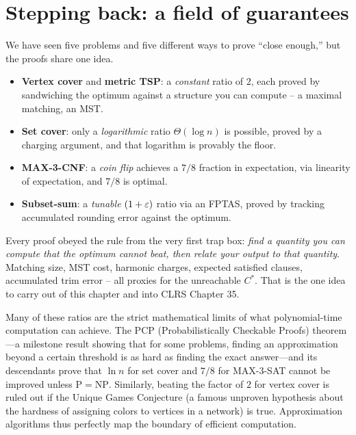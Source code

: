 \section{Stepping back: a field of guarantees}

We have seen five problems and five different ways to prove ``close
enough,'' but the proofs share one idea.

\begin{itemize}
\item \textbf{Vertex cover} and \textbf{metric TSP}: a \emph{constant} ratio
of $2$, each proved by sandwiching the optimum against a structure you can
compute -- a maximal matching, an MST.
\item \textbf{Set cover}: only a \emph{logarithmic} ratio $\Theta(\log n)$ is
possible, proved by a charging argument, and that logarithm is provably the
floor.
\item \textbf{MAX-3-CNF}: a \emph{coin flip} achieves a $7/8$ fraction in
expectation, via linearity of expectation, and $7/8$ is optimal.
\item \textbf{Subset-sum}: a \emph{tunable} $(1+\varepsilon)$ ratio via an FPTAS,
proved by tracking accumulated rounding error against the optimum.
\end{itemize}

Every proof obeyed the rule from the very first trap box: \emph{find a
quantity you can compute that the optimum cannot beat, then relate your output
to that quantity}. Matching size, MST cost, harmonic charges, expected
satisfied clauses, accumulated trim error -- all proxies for the unreachable
$C^{*}$. That is the one idea to carry out of this chapter and into CLRS
Chapter 35.

\begin{aestheticbox}
Many of these ratios are the strict mathematical limits of what polynomial-time computation can achieve. The PCP (Probabilistically Checkable Proofs) theorem---a milestone result showing that for some problems, finding an approximation beyond a certain threshold is as hard as finding the exact answer---and its descendants prove that $\ln n$ for set cover and $7/8$ for MAX-3-SAT cannot be improved unless $\mathrm{P} = \mathrm{NP}$. Similarly, beating the factor of $2$ for vertex cover is ruled out if the Unique Games Conjecture (a famous unproven hypothesis about the hardness of assigning colors to vertices in a network) is true. Approximation algorithms thus perfectly map the boundary of efficient computation.
\end{aestheticbox}

